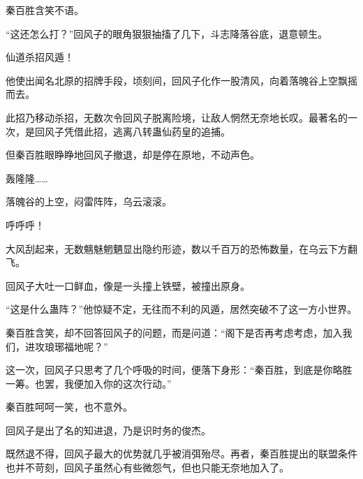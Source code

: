 \begin{this_body}
秦百胜含笑不语。

“这还怎么打？”回风子的眼角狠狠抽搐了几下，斗志降落谷底，退意顿生。

仙道杀招风遁！

他使出闻名北原的招牌手段，顷刻间，回风子化作一股清风，向着落魄谷上空飘摇而去。

此招乃移动杀招，无数次令回风子脱离险境，让敌人惘然无奈地长叹。最著名的一次，是回风子凭借此招，逃离八转蛊仙药皇的追捕。

但秦百胜眼睁睁地回风子撤退，却是停在原地，不动声色。

轰隆隆……

落魄谷的上空，闷雷阵阵，乌云滚滚。

呼呼呼！

大风刮起来，无数魑魅魍魉显出隐约形迹，数以千百万的恐怖数量，在乌云下方翻飞。

回风子大吐一口鲜血，像是一头撞上铁壁，被撞出原身。

“这是什么蛊阵？”他惊疑不定，无往而不利的风遁，居然突破不了这一方小世界。

秦百胜含笑，却不回答回风子的问题，而是问道：“阁下是否再考虑考虑，加入我们，进攻琅琊福地呢？”

这一次，回风子只思考了几个呼吸的时间，便落下身形：“秦百胜，到底是你略胜一筹。也罢，我便加入你的这次行动。”

秦百胜呵呵一笑，也不意外。

回风子是出了名的知进退，乃是识时务的俊杰。

既然退不得，回风子最大的优势就几乎被消弭殆尽。再者，秦百胜提出的联盟条件也并不苛刻，回风子虽然心有些微怨气，但也只能无奈地加入了。

\end{this_body}


